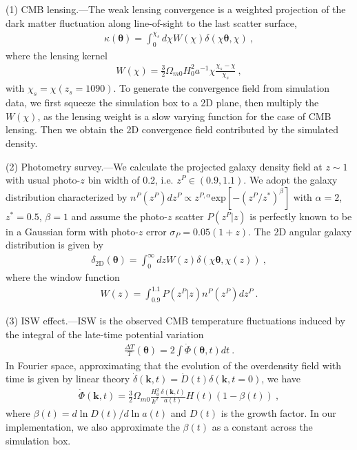 \documentclass[aps,prl,twocolumn,showpacs,superscriptaddress,groupedaddress,nofootinbib]{revtex4}  %
\newcommand{\mr}{\mathrm}
\begin{document}
(1) CMB lensing.---The weak lensing convergence is a weighted projection
of the dark matter fluctuation along line-of-sight to the last scatter surface,
\begin{eqnarray}
\kappa(\bm{\theta})=\int_0^{\chi_s}d\chi 
W(\chi)\delta(\chi\bm{\theta},\chi)\ ,
\end{eqnarray}
where the lensing kernel
\begin{eqnarray}
W(\chi)=\frac{3}{2}\Omega_{m0}H_0^2a^{-1}\chi\frac{\chi_s-\chi}{\chi_s}\ ,
\end{eqnarray}
with $\chi_s=\chi(z_s=1090)$.
To generate the convergence field from simulation data, we first squeeze the 
simulation box to a 2D plane, then multiply the $W(\chi)$, as the lensing
weight is a slow varying function for the case of CMB lensing.
Then we obtain the 2D convergence field contributed by the simulated density.

(2) Photometry survey.---We calculate the projected galaxy density field 
at $z\sim 1$ with usual photo-$z$ bin width of $0.2$, i.e. $z^P\in(0.9,1.1)$. 
We adopt the galaxy distribution characterized by 
$n^P(z^P)dz^P\propto z^{P,\alpha}\mr{exp}[-(z^P/z^{*})^\beta]$
with $\alpha=2$, $z^*=0.5$, $\beta=1$
and assume the photo-$z$ scatter $P(z^P|z)$ is perfectly known to be in a Gaussian form with photo-$z$ error $\sigma_P=0.05(1+z)$.
The 2D angular galaxy distribution is given by
\begin{eqnarray}
\delta_\mr{2D}(\bm{\theta})=\int_0^\infty dzW(z)
\delta(\chi\bm{\theta},\chi(z))\ ,
\end{eqnarray}
where the window function 
\begin{eqnarray}
W(z)=\int_{0.9}^{1.1}P(z^P|z) n^P(z^P) dz^P\ . 
\end{eqnarray}

(3) ISW effect.---ISW is the observed CMB temperature fluctuations induced by the integral of the late-time potential variation
\begin{eqnarray}
\frac{\Delta T}{T}(\bm\theta)=2\int \dot\Phi(\bm{\theta},t)dt\ .
\end{eqnarray}
In Fourier space, approximating that the evolution of the overdensity field with time is given by linear theory
$\dot\delta(\bm{k},t)=\dot D(t)\delta(\bm{k},t=0)$, we have
\begin{eqnarray}
\dot\Phi(\bm{k},t)=\frac{3}{2}\Omega_{m0}\frac{H_0^2}{k^2}\frac{\delta(\bm{k},t)}{a(t)}H(t)(1-\beta(t))\ ,
\end{eqnarray}
where $\beta(t)=d\ln D(t)/d\ln a(t)$ and $D(t)$ is the growth factor.
In our implementation, we also approximate the $\beta(t)$ as a constant across the simulation box.
\end{document}
